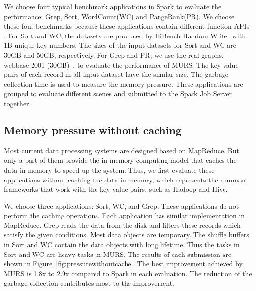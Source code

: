 We choose four typical benchmark applications in Spark to evaluate the performance: Grep, Sort, WordCount(WC) and PangeRank(PR). 
We choose these four benchmarks because these applications contain different function APIs
. For Sort and WC, the datasets are produced by HiBench Random Writer with 1B unique key numbers. The sizes of the input datasets for Sort and WC are 30GB and 50GB, respectively. For Grep and PR, we use the real graphs, webbase-2001 (30GB)~\cite{boldi:webgraph}, to evaluate the performance of MURS. The key-value pairs of each record in all input dataset have the similar size. 
The garbage collection time is used to measure the memory pressure. These applications are grouped to evaluate different scenes and submitted to the Spark Job Server together.

\subsection{Memory pressure without caching}

Most current data processing systems are designed based on MapReduce. But only a part of them provide the in-memory computing model that caches the data in memory to speed up the system. Thus, we first evaluate these applications without caching the data in memory, which represents the common frameworks that work with the key-value pairs, such as Hadoop and Hive.

We choose three applications: Sort, WC, and Grep. These applications do not perform the caching operations. Each application has similar implementation in MapReduce. Grep reads the data from the disk and filters these records which satisfy the given conditions. Most data objects are temporary. The shuffle buffers in Sort and WC contain the data objects with long lifetime. Thus the tasks in Sort and WC are heavy tasks in MURS. The results of each submission are shown in Figure~\ref{fig:pressurewithoutcache}. The best improvement achieved by MURS is 1.8x to 2.9x compared to Spark in each evaluation. The reduction of the garbage collection contributes most to the improvement.

